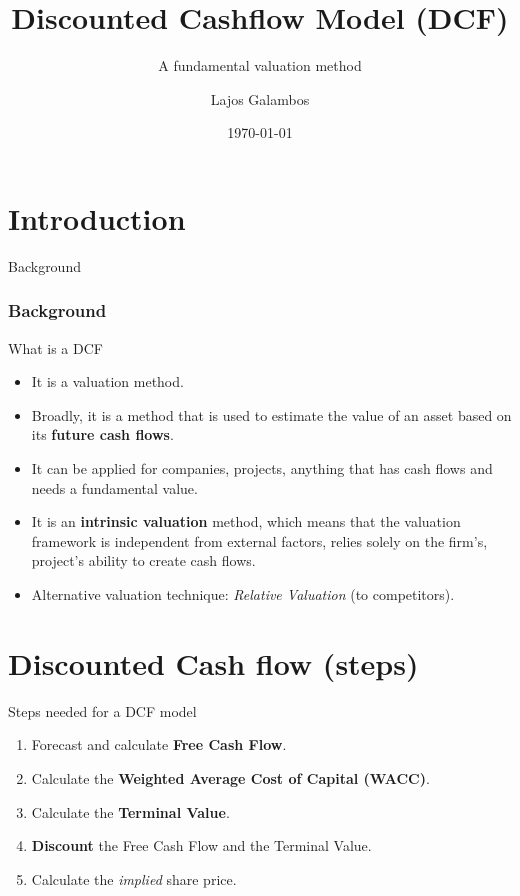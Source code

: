 \documentclass[serif, aspectratio=169]{beamer}
\author{Lajos Galambos}
\title{Discounted Cashflow Model (DCF)}
\subtitle{A fundamental valuation method}
\date{\small \today}
\begin{document}
\begin{frame}
    \titlepage
    \vspace*{-0.6cm}
\end{frame}

\begin{frame}    
\tableofcontents[sectionstyle=show,
subsectionstyle=show/shaded/hide,
subsubsectionstyle=show/shaded/hide]
\end{frame}


\section{Introduction}
\begin{frame}{Background}
	\frametitle<presentation>{Background}
	\begin{block}{What is a DCF}
		\begin{itemize}
			\item It is a valuation method.
			\item Broadly, it is a method that is used to estimate the value of an asset based on its \textbf{future cash flows}.
			\item It can be applied for companies, projects, anything that has cash flows and needs a fundamental value.
   \item It is an \textbf{intrinsic valuation} method, which means that the valuation framework is independent from external factors, relies solely on the firm's, project's ability to create cash flows. 
   \item Alternative valuation technique: \textit{Relative Valuation} (to competitors).
		\end{itemize}
	\end{block}
	
\end{frame}

\section{Discounted Cash flow (steps)}
\begin{frame}{Steps needed for a DCF model}
	\begin{enumerate}
			\item Forecast and calculate \textbf{Free Cash Flow}.
			\item Calculate the \textbf{Weighted Average Cost of Capital (WACC)}.
			\item Calculate the \textbf{Terminal Value}.
            \item \textbf{Discount} the Free Cash Flow and the Terminal Value. 
            \item Calculate the \textit{implied} share price.
		\end{enumerate}
	
\end{frame}
\end{document}
